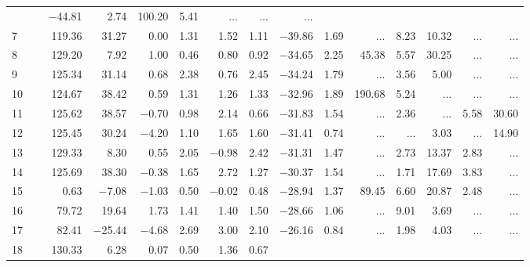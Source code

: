 \begin{table*}[p]
{\begin{tabular}{l@{ }r@{ \ }rr@{ \ }rr@{ \ }rrrr@{ \ }r@{ \ }r@{ \ }r@{ \ }r}
 & $-$44.81 &   2.74
  &      100.20 &        5.41 &    ...     &    ...     &    ...       \\     
  7   \ \dotfill \  &    119.36 &     31.27 &    0.00 &   1.31 &    1.52 &   1.11
 & $-$39.86 &   1.69
  &    ...     &        8.23 &       10.32 &    ...     &    ...       \\     
  8   \ \dotfill \  &    129.20 &      7.92 &    1.00 &   0.46 &    0.80 &   0.92
 & $-$34.65 &   2.25
  &       45.38 &        5.57 &       30.25 &    ...     &    ...       \\     
  9   \ \dotfill \  &    125.34 &     31.14 &    0.68 &   2.38 &    0.76 &   2.45
 & $-$34.24 &   1.79
  &    ...     &        3.56 &        5.00 &    ...     &    ...       \\     
 10   \ \dotfill \  &    124.67 &     38.42 &    0.59 &   1.31 &    1.26 &   1.33
 & $-$32.96 &   1.89
  &      190.68 &        5.24 &    ...     &    ...     &    ...       \\     
 11   \ \dotfill \  &    125.62 &     38.57 &  $-$0.70 &   0.98 &    2.14 &   0.66
 & $-$31.83 &   1.54
  &    ...     &        2.36 &    ...     &        5.58 &       30.60   \\     
 12   \ \dotfill \  &    125.45 &     30.24 &  $-$4.20 &   1.10 &    1.65 &   1.60
 & $-$31.41 &   0.74
  &    ...     &    ...     &        3.03 &    ...     &       14.90   \\     
 13   \ \dotfill \  &    129.33 &      8.30 &    0.55 &   2.05 &  $-$0.98 &   2.42
 & $-$31.31 &   1.47
  &    ...     &        2.73 &       13.37 &        2.83 &    ...       \\     
 14   \ \dotfill \  &    125.69 &     38.30 &  $-$0.38 &   1.65 &    2.72 &   1.27
 & $-$30.37 &   1.54
  &    ...     &        1.71 &       17.69 &        3.83 &    ...       \\     
 15   \ \dotfill \  &      0.63 &    $-$7.08 &  $-$1.03 &   0.50 &  $-$0.02 &   0.48
 & $-$28.94 &   1.37
  &       89.45 &        6.60 &       20.87 &        2.48 &    ...       \\     
 16   \ \dotfill \  &     79.72 &     19.64 &    1.73 &   1.41 &    1.40 &   1.50
 & $-$28.66 &   1.06
  &    ...     &        9.01 &        3.69 &    ...     &    ...       \\     
 17   \ \dotfill \  &     82.41 &   $-$25.44 &  $-$4.68 &   2.69 &    3.00 &   2.10
 & $-$26.16 &   0.84
  &    ...     &        1.98 &        4.03 &    ...     &    ...       \\     
 18   \ \dotfill \  &    130.33 &      6.28 &    0.07 &   0.50 &    1.36 &   0.67

\end{tabular}}
\end{table*}
